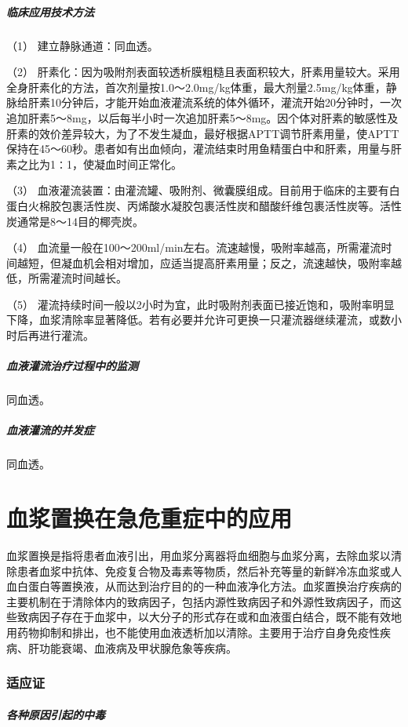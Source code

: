 \subparagraph{临床应用技术方法}

（1） 建立静脉通道：同血透。

（2）
肝素化：因为吸附剂表面较透析膜粗糙且表面积较大，肝素用量较大。采用全身肝素化的方法，首次剂量按1.0～2.0mg/kg体重，最大剂量2.5mg/kg体重，静脉给肝素10分钟后，才能开始血液灌流系统的体外循环，灌流开始20分钟时，一次追加肝素5～8mg，以后每半小时一次追加肝素5～8mg。因个体对肝素的敏感性及肝素的效价差异较大，为了不发生凝血，最好根据APTT调节肝素用量，使APTT保持在45～60秒。患者如有出血倾向，灌流结束时用鱼精蛋白中和肝素，用量与肝素之比为1∶1，使凝血时间正常化。

（3）
血液灌流装置：由灌流罐、吸附剂、微囊膜组成。目前用于临床的主要有白蛋白火棉胶包裹活性炭、丙烯酸水凝胶包裹活性炭和醋酸纤维包裹活性炭等。活性炭通常是8～14目的椰壳炭。

（4）
血流量一般在100～200ml/min左右。流速越慢，吸附率越高，所需灌流时间越短，但凝血机会相对增加，应适当提高肝素用量；反之，流速越快，吸附率越低，所需灌流时间越长。

（5）
灌流持续时间一般以2小时为宜，此时吸附剂表面已接近饱和，吸附率明显下降，血浆清除率显著降低。若有必要并允许可更换一只灌流器继续灌流，或数小时后再进行灌流。

\subparagraph{血液灌流治疗过程中的监测}

同血透。

\subparagraph{血液灌流的并发症}

同血透。

\protect\hypertarget{text00393.html}{}{}

\section{血浆置换在急危重症中的应用}

血浆置换是指将患者血液引出，用血浆分离器将血细胞与血浆分离，去除血浆以清除患者血浆中抗体、免疫复合物及毒素等物质，然后补充等量的新鲜冷冻血浆或人血白蛋白等置换液，从而达到治疗目的的一种血液净化方法。血浆置换治疗疾病的主要机制在于清除体内的致病因子，包括内源性致病因子和外源性致病因子，而这些致病因子存在于血浆中，以大分子的形式存在或和血液蛋白结合，既不能有效地用药物抑制和排出，也不能使用血液透析加以清除。主要用于治疗自身免疫性疾病、肝功能衰竭、血液病及甲状腺危象等疾病。

\subsubsection{适应证}

\subparagraph{各种原因引起的中毒}

